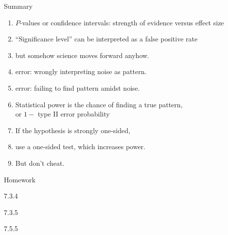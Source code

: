 \begin{frame}{Summary}
  \begin{enumerate}
    \item $P$-values or confidence intervals: strength of evidence versus effect size
    \item ``Significance level'' can be interpreted as a \alert{false positive rate}
    \item but somehow science moves forward anyhow.
    \item {} error: wrongly interpreting noise as pattern.
    \item {} error: failing to find pattern amidst noise.
    \item \alert{Statistical power} is the chance of finding a true pattern, \\
      or $1-{}$ type II error probability
    \item If the hypothesis is strongly one-sided,
    \item use a one-sided test, which increases power.
    \item But don't cheat.
  \end{enumerate}
\end{frame}

\begin{frame}{Homework}
  \begin{center}

      7.3.4

    \vspace{2em}

    7.3.5

    \vspace{2em}

    7.5.5

  \end{center}
\end{frame}








